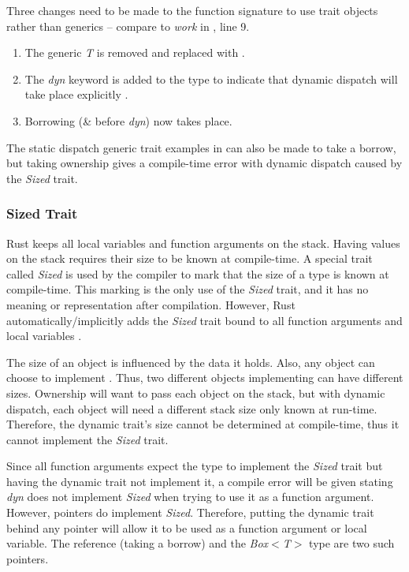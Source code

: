 
Three changes need to be made to the function signature to use trait objects rather than generics -- compare to \textit{work} in , line 9.
\begin{enumerate}
	\item The generic \textit{T} is removed and replaced with .
	\item The \textit{dyn} keyword is added to the type to indicate that dynamic dispatch will take place explicitly \cite{klabnik_2019_01}.
	\item Borrowing (\& before \textit{dyn}) now takes place.
\end{enumerate}

The static dispatch generic trait examples in  can also be made to take a borrow, but taking ownership gives a compile-time error with dynamic dispatch caused by the \textit{Sized} trait.

\subsubsection{Sized Trait}
\label{sec:sized-trait}
Rust keeps all local variables and function arguments on the stack.
Having values on the stack requires their size to be known at compile-time.
A special trait called \textit{Sized} is used by the compiler to mark that the size of a type is known at compile-time.
This marking is the only use of the \textit{Sized} trait, and it has no meaning or representation after compilation.
However, Rust automatically/implicitly adds the \textit{Sized} trait bound to all function arguments and local variables \cite{klabnik_2019_01}.

The size of an object is influenced by the data it holds.
Also, any object can choose to implement .
Thus, two different objects implementing  can have different sizes.
Ownership will want to pass each object on the stack, but with dynamic dispatch, each object will need a different stack size only known at run-time.
Therefore, the  dynamic trait's size cannot be determined at compile-time, thus it cannot implement the \textit{Sized} trait.

Since all function arguments expect the type to implement the \textit{Sized} trait but having the  dynamic trait not implement it, a compile error will be given stating \textit{dyn } does not implement \textit{Sized} when trying to use it as a function argument.
However, pointers do implement \textit{Sized}.
Therefore, putting the dynamic trait behind any pointer will allow it to be used as a function argument or local variable.
The reference (taking a borrow) and the \textit{Box$<$T$>$} type are two such pointers\cite{klabnik_2019_01}.

